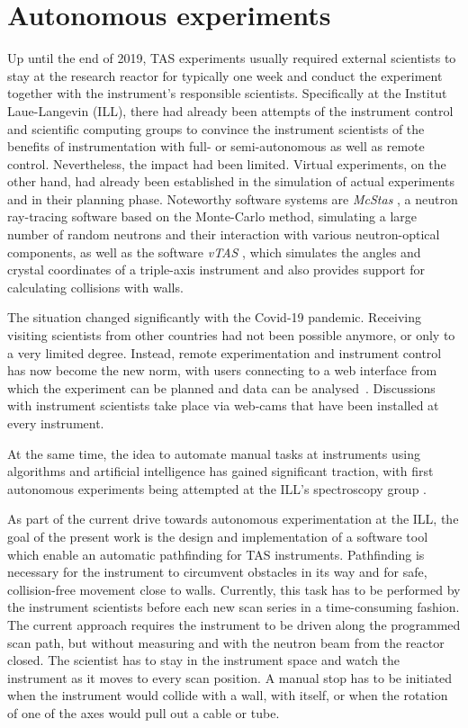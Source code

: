 \section{Autonomous experiments \label{sec:autonomous}}

Up until the end of 2019, TAS experiments usually required external scientists to stay at the research reactor for
typically one week and conduct the experiment together with the instrument's responsible scientists. Specifically
at the Institut Laue-Langevin (ILL), there had already been attempts \cite{Song2020} of the instrument control
and scientific computing groups to convince the instrument scientists of the benefits of instrumentation with full- or
semi-autonomous as well as remote control. Nevertheless, the impact had been limited.
Virtual experiments, on the other hand, had already been established in the simulation of actual experiments and in their
planning phase. Noteworthy software systems are \textit{McStas} \cite{McStas2020, McStas2021}, a neutron ray-tracing software based on the
Monte-Carlo method, simulating a large number of random neutrons and their interaction with various neutron-optical components,
as well as the software \textit{vTAS} \cite{vTAS2013}, which simulates the angles and crystal coordinates of a triple-axis
instrument and also provides support for calculating collisions with walls.

The situation changed significantly with the Covid-19 pandemic. Receiving visiting scientists from other countries had
not been possible anymore, or only to a very limited degree. Instead, remote experimentation and instrument control has
now become the new norm, with users connecting to a web interface from which the experiment can be planned and data can
be analysed~\cite{web_ill_visa}.
Discussions with instrument scientists take place via web-cams that have been installed at every instrument.

At the same time, the idea to automate manual tasks at instruments using algorithms and artificial intelligence has
gained significant traction, with first autonomous experiments being attempted at the ILL's spectroscopy group
\cite{web_ill_autonomous2020, Noack2021}.

As part of the current drive towards autonomous experimentation at the ILL, the goal of the present work is the design
and implementation of a software tool which enable an automatic pathfinding for TAS instruments. Pathfinding
is necessary for the instrument to circumvent obstacles in its way and for safe, collision-free movement close to walls.
Currently, this task has to be performed by the instrument scientists before each new scan series in a time-consuming fashion.
The current approach requires the instrument to be driven along the programmed scan path, but without measuring and with
the neutron beam from the reactor closed.
The scientist has to stay in the instrument space and watch the instrument as it moves to every scan position.
A manual stop has to be initiated when the instrument would collide with a wall, with itself, or when the rotation of one
of the axes would pull out a cable or tube.

